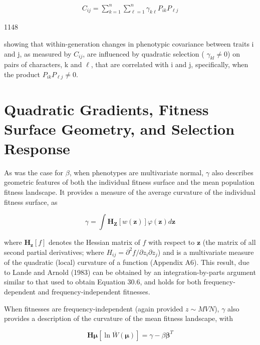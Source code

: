 \documentclass{article}
\begin{document}
\begin{equation}
\begin{align*}C_{ij}=\sum\limits_{k=1}^n\sum\limits_{\ell=1}^n\gamma_{k\ell}P_{ik}P_{\ell j}\end{align*}
\tag{30.14}
\label{eq:30_14}
\end{equation}

1148

showing that within-generation changes in phenotypic covariance between traits i and j, as measured by  $ C_{ij} $, are influenced by quadratic selection ( $ \gamma_{kl} \neq 0 $) on pairs of characters, k and  $ \ell $, that are correlated with i and j, specifically, when the product  $ P_{ik} P_{\ell j} \neq 0 $.

\section{Quadratic Gradients, Fitness Surface Geometry, and Selection Response}
As was the case for  $ \beta $, when phenotypes are multivariate normal,  $ \gamma $ also describes geometric features of both the individual fitness surface and the mean population fitness landscape. It provides a measure of the average curvature of the individual fitness surface, as

\begin{equation}
\gamma=\int\mathbf{H_{Z}}[w(\mathbf{z})]\varphi(\mathbf{z})d\mathbf{z}
\tag{30.15a}
\label{eq:30_15a}
\end{equation}

where  $ \mathbf{H}_{\mathbf{z}}[f] $ denotes the Hessian matrix of  $ f $ with respect to  $ \mathbf{z} $ (the matrix of all second partial derivatives; where  $ H_{ij} = \partial^2 f / \partial z_i \partial z_j $) and is a multivariate measure of the quadratic (local) curvature of a function (Appendix A6). This result, due to Lande and Arnold (1983) can be obtained by an integration-by-parts argument similar to that used to obtain Equation 30.6, and holds for both frequency-dependent and frequency-independent fitnesses.

When fitnesses are frequency-independent (again provided  $ z \sim MVN $),  $ \gamma $ also provides a description of the curvature of the mean fitness landscape, with

\begin{equation}
\mathbf{H}\boldsymbol{\mu}[\ln\overline{W}(\boldsymbol{\mu})]=\gamma-\beta\boldsymbol{\beta}^{T}
\tag{30.15b}
\label{eq:30_15b}
\end{equation}
\end{document}
